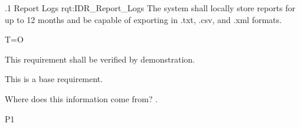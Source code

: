 \ONERQMTVKSA
{\RqtNumberBase.1}
{Report Logs}
{rqt:IDR_Report_Logs}
{The system shall locally store reports for up to 12 months and be capable of exporting in .txt, .csv, and .xml formats.}
{
	\item [Phase 1] T=O
}
{This requirement shall be verified by demonstration.}
{
\item [N/A] This is a base requirement.
}
{
	\item Where does this information come from? \TBD.
}
{P1}
